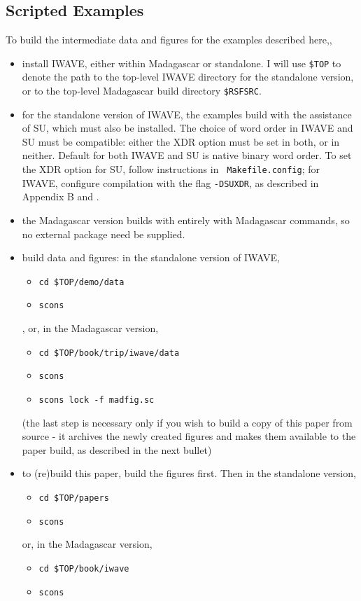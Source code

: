 \subsection{Scripted Examples}
To build the intermediate data and figures for  the examples described
here,,
\begin{itemize}
\item install IWAVE, either within Madagascar or standalone. I will use  {\tt \$TOP} to denote
  the path to the top-level IWAVE directory for the standalone
  version, or to the top-level Madagascar build directory {\tt \$RSFSRC}.
\item for the standalone version of IWAVE, the examples build with the
  assistance of SU, which must also be installed. The choice of word
  order in IWAVE and SU must be compatible: either the XDR option must
  be set in both, or in neither. Default for both IWAVE and SU is native binary
  word order. To set the XDR option for SU, follow instructions in {\tt
    Makefile.config}; for IWAVE, configure compilation with the flag
  {\tt -DSUXDR}, as described in Appendix B and \cite[]{IWAVE}.
\item the Madagascar version builds with entirely with Madagascar commands,
  so no external package need be supplied.
\item build data and figures: in the standalone version of IWAVE,
\begin{itemize}
  \item {\tt cd \$TOP/demo/data}
\item {\tt scons}
\end{itemize},
or, in the Madagascar version,
\begin{itemize}
\item {\tt cd \$TOP/book/trip/iwave/data}
\item {\tt scons}
\item {\tt scons lock -f madfig.sc}
\end{itemize}
(the last step is necessary only if you wish to build a copy of this
paper from source - it archives the newly created figures and makes
them available to the paper build, as described in the next bullet)
\item to (re)build this paper, build the figures first. Then in the standalone version,
\begin{itemize}
\item {\tt cd \$TOP/papers}
\item {\tt scons}
\end{itemize} 
or, in the Madagascar version,
\begin{itemize}
\item {\tt cd \$TOP/book/iwave}
\item {\tt scons}
\end{itemize}

\end{itemize}
